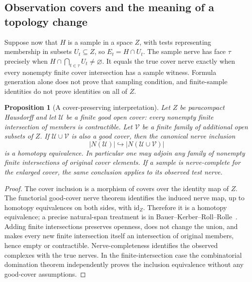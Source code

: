 \documentclass[11pt]{article}
\newtheorem{proposition}[theorem]{Proposition}
\theoremstyle{definition}
\begin{document}
\subsection{Observation covers and the meaning of a topology change}

Suppose now that $H$ is a sample in a space $Z$, with tests representing
membership in subsets $U_t\subseteq Z$, so $E_t=H\cap U_t$.
The sample nerve has face $\tau$ precisely when
$H\cap\bigcap_{t\in\tau}U_t\neq\varnothing$. It equals the true
cover nerve exactly when every nonempty finite cover intersection has
a sample witness. Formula generation alone does not prove that sampling
condition, and finite-sample identities do not prove identities on all
of $Z$.

\begin{proposition}[A cover-preserving interpretation]
\label{gt:cover}
Let $Z$ be paracompact Hausdorff and let $\mathcal U$ be a finite good
open cover: every nonempty finite intersection of members is
contractible. Let $\mathcal V$ be a finite family of additional open
subsets of $Z$. If $\mathcal U\cup\mathcal V$ is also a good cover,
then the canonical nerve inclusion
\[
 |N(\mathcal U)|\hookrightarrow|N(\mathcal U\cup\mathcal V)|
\]
is a homotopy equivalence. In particular one may adjoin any family of
nonempty finite intersections of original cover elements. If a sample
is nerve-complete for the enlarged cover, the same conclusion applies
to its observed test nerve.
\end{proposition}
\begin{proof}
The cover inclusion is a morphism of covers over the identity map of
$Z$. The functorial good-cover nerve theorem identifies the induced
nerve map, up to homotopy equivalences on both sides, with
$\mathrm{id}_Z$. Therefore it is a homotopy equivalence; a precise
natural-span treatment is in
Bauer--Kerber--Roll--Rolle~\cite{BauerEtAl}. Adding finite intersections
preserves openness, does not change the union, and makes every new
finite intersection itself an intersection of original members, hence
empty or contractible. Nerve-completeness identifies the observed
complexes with the true nerves. In the finite-intersection case the
combinatorial domination theorem independently proves the inclusion
equivalence without any good-cover assumptions.
\end{proof}
\end{document}
